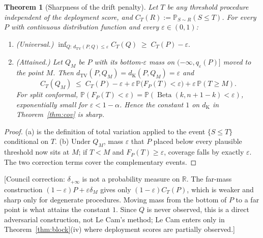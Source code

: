 \documentclass[11pt,a4paper]{article}
\newcommand{\corr}[1]{{\color{ox}\textsf{\small [Council correction: #1]}}}
\theoremstyle{plain}
\newtheorem{theorem}{Theorem}
\theoremstyle{definition}
\theoremstyle{remark}
\newcommand{\Prob}{\mathbb{P}}
\newcommand{\R}{\mathbb{R}}
\newcommand{\dTV}{d_{\mathrm{TV}}}
\newcommand{\dK}{d_{\mathrm{K}}}
\DeclareMathOperator{\Beta}{Beta}
\begin{document}
\begin{theorem}[Sharpness of the drift penalty]\label{thm:sharp}
Let $T$ be any threshold procedure independent of the deployment score, and $C_T(R):=\Prob_{S\sim R}(S\le T)$. For every $P$ with continuous distribution function and every $\varepsilon\in(0,1)$:
\begin{enumerate}[nosep,label=(\alph*)]
\item (Universal.) $\displaystyle\inf_{Q:\,\dTV(P,Q)\le\varepsilon}C_T(Q)\;\ge\;C_T(P)-\varepsilon.$
\item (Attained.) Let $Q_M$ be $P$ with its bottom-$\varepsilon$ mass on $(-\infty,q_\varepsilon(P)]$ moved to the point $M$. Then $\dTV(P,Q_M)=\dK(P,Q_M)=\varepsilon$ and
\[
C_T(Q_M)\;\le\;C_T(P)-\varepsilon+\varepsilon\,\Prob\big(F_P(T)<\varepsilon\big)+\varepsilon\,\Prob(T\ge M).
\]
For split conformal, $\Prob(F_P(T)<\varepsilon)=\Prob(\Beta(k,n+1-k)<\varepsilon)$, exponentially small for $\varepsilon<1-\alpha$. Hence the constant $1$ on $\dK$ in Theorem~\ref{thm:cov} is sharp.
\end{enumerate}
\end{theorem}
\begin{proof}
(a) is the definition of total variation applied to the event $\{S\le T\}$ conditional on $T$. (b) Under $Q_M$, mass $\varepsilon$ that $P$ placed below every plausible threshold now sits at $M$; if $T<M$ and $F_P(T)\ge\varepsilon$, coverage falls by exactly $\varepsilon$. The two correction terms cover the complementary events.
\end{proof}
\corr{$\delta_{+\infty}$ is not a probability measure on $\R$. The far-mass construction $(1-\varepsilon)P+\varepsilon\delta_M$ gives only $(1-\varepsilon)C_T(P)$, which is weaker and sharp only for degenerate procedures. Moving mass from the bottom of $P$ to a far point is what attains the constant $1$. Since $Q$ is never observed, this is a direct adversarial construction, not Le Cam's method; Le Cam enters only in Theorem~\ref{thm:block}(iv) where deployment scores are partially observed.}
\end{document}
